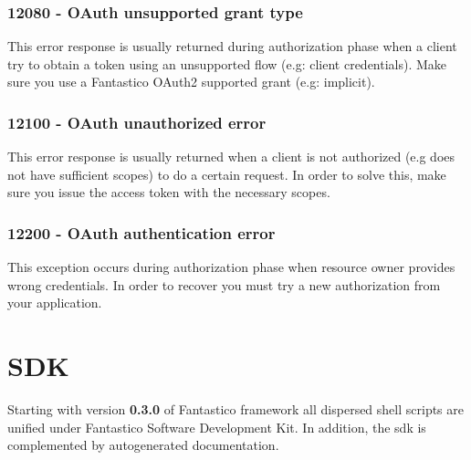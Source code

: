 \documentclass[letterpaper,10pt,english]{sphinxmanual}
\begin{document}
\subsubsection{12080 - OAuth unsupported grant type}
\label{features/oauth2/exceptions/12080:oauth-unsupported-grant-type}\label{features/oauth2/exceptions/12080::doc}
This error response is usually returned during authorization phase when a client try to obtain a token using an unsupported flow
(e.g: client credentials). Make sure you use a Fantastico OAuth2 supported grant (e.g: implicit).


\subsubsection{12100 - OAuth unauthorized error}
\label{features/oauth2/exceptions/12100:oauth-unauthorized-error}\label{features/oauth2/exceptions/12100::doc}
This error response is usually returned when a client is not authorized (e.g does not have sufficient scopes) to do a certain
request. In order to solve this, make sure you issue the access token with the necessary scopes.


\subsubsection{12200 - OAuth authentication error}
\label{features/oauth2/exceptions/12200:oauth-authentication-error}\label{features/oauth2/exceptions/12200::doc}
This exception occurs during authorization phase when resource owner provides wrong credentials. In order to recover you must
try a new authorization from your application.


\section{SDK}
\label{features/sdk::doc}\label{features/sdk:sdk}
Starting with version \textbf{0.3.0} of Fantastico framework all dispersed shell scripts are unified under Fantastico Software
Development Kit. In addition, the sdk is complemented by autogenerated documentation.
\end{document}
